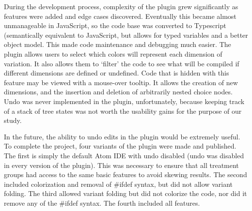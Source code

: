 During the development process, complexity of the plugin grew significantly as features were added and edge cases discovered. Eventually this became almost unmanageable in JavaScript, so the code base was converted to Typescript (semantically equivalent to JavaScript, but allows for typed variables and a better object model. This made code maintenance and debugging much easier.
The plugin allows users to select which colors will represent each dimension of variation. It also allows them to ‘filter’ the code to see what will be compiled if different dimensions are defined or undefined. Code that is hidden with this feature may be viewed with a mouse-over tooltip. It allows the creation of new dimensions, and the insertion and deletion of arbitrarily nested choice nodes. Undo was never implemented in the plugin, unfortunately, because keeping track of a stack of tree states was not worth the usability gains for the purpose of our study. 

In the future, the ability to undo edits in the plugin would be extremely useful.
To complete the project, four variants of the plugin were made and published. The first is simply the default Atom IDE with undo disabled (undo was disabled in every version of the plugin). This was necessary to ensure that all treatment groups had access to the same basic features to avoid skewing results. The second included colorization and removal of \#ifdef syntax, but did not allow variant folding. The third allowed variant folding but did not colorize the code, nor did it remove any of the \#ifdef syntax. The fourth included all features.
	
